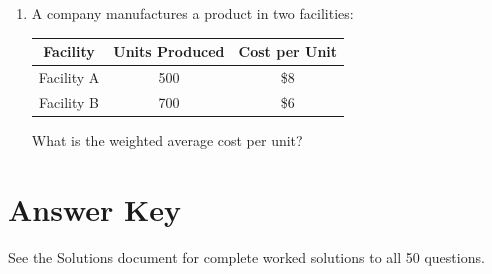 \documentclass[12pt,a4paper]{article}
\begin{document}
\begin{enumerate}
\item A company manufactures a product in two facilities:
\begin{center}
\begin{tabular}{|c|c|c|}
\hline
Facility & Units Produced & Cost per Unit \\
\hline
Facility A & 500 & \$8 \\
Facility B & 700 & \$6 \\
\hline
\end{tabular}
\end{center}
What is the weighted average cost per unit?

\end{enumerate}

\newpage

\section{Answer Key}
See the Solutions document for complete worked solutions to all 50 questions.
\end{document}
